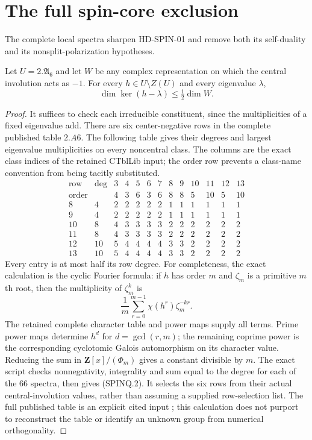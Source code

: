 \section{The full spin-core exclusion}
\label{sec:spin-quarter-obstruction}

The complete local spectra sharpen HD-SPIN-01 and remove both
its self-duality and its nonsplit-polarization hypotheses.

\begin{lemma}
\label{HD-SPIN-02a}
Let $U=2.\mathfrak A_6$ and let $W$ be any complex representation
on which the central involution acts as $-1$.  For every
$h\in U\setminus Z(U)$ and every eigenvalue $\lambda$,
\[
                   \dim\ker(h-\lambda)\le\tfrac12\dim W.
                                                               \tag{SPINQ.1}
\]
\end{lemma}

\begin{proof}
It suffices to check each irreducible constituent, since the
multiplicities of a fixed eigenvalue add.  There are six
center-negative rows in the complete published table $2.A6$.
The following table gives their degrees and largest eigenvalue
multiplicities on every noncentral class.  The columns are the
exact class indices of the retained CTblLib input; the order row
prevents a class-name convention from being tacitly substituted.
\[
\begin{array}{c|r|rrrrrrrrrrr}
\text{row}&\deg&3&4&5&6&7&8&9&10&11&12&13\\\hline
\text{order}&&4&3&6&3&6&8&8&5&10&5&10\\\hline
8 &4 &2&2&2&2&2&1&1&1&1&1&1\\
9 &4 &2&2&2&2&2&1&1&1&1&1&1\\
10&8 &4&3&3&3&3&2&2&2&2&2&2\\
11&8 &4&3&3&3&3&2&2&2&2&2&2\\
12&10&5&4&4&4&4&3&3&2&2&2&2\\
13&10&5&4&4&4&4&3&3&2&2&2&2
\end{array}                                                   \tag{SPINQ.2}
\]
Every entry is at most half its row degree.  For completeness,
the exact calculation is the cyclic Fourier formula: if $h$ has
order $m$ and $\zeta_m$ is a primitive $m$th root, then the
multiplicity of $\zeta_m^k$ is
\[
       \frac1m\sum_{r=0}^{m-1}\chi(h^r)\zeta_m^{-kr}.           \tag{SPINQ.3}
\]
The retained complete character table and power maps supply all
terms.  Prime power maps determine $h^d$ for $d=\gcd(r,m)$;
the remaining coprime power is the corresponding cyclotomic
Galois automorphism on its character value.  Reducing the sum
in $\mathbf Z[x]/(\Phi_m)$ gives a constant divisible by $m$.
The exact script checks nonnegativity, integrality and sum equal
to the degree for each of the $66$ spectra, then gives (SPINQ.2).
It selects the six rows from their actual central-involution
values, rather than assuming a supplied row-selection list.
The full published table is an explicit cited input
\cite{SPOR:CTblLib}; this calculation does not purport to reconstruct
the table or identify an unknown group from numerical orthogonality.
\end{proof}

